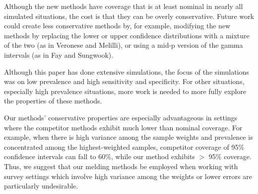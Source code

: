 Although the new methods have coverage that is at least nominal in nearly all simulated situations, the cost is that they can be overly conservative.
Future work could create less conservative methods by, for example, modifying the new methods by replacing the lower or upper confidence distributions with a mixture of the two (as in Veronese and Melilli\cite{veronese2015}), or using a mid-p version of the gamma intervals (as in Fay and Sungwook\cite{FayK:2017}).

Although this paper has done extensive simulations, the focus of the simulations was on low prevalence and high
sensitivity and specificity. For other situations, especially high prevalence situations, more work is needed to more fully explore the properties of these methods.

Our methods' conservative properties are especially advantageous in settings where the competitor methods exhibit much lower than nominal coverage.
For example, when there is high variance among the sample weights and prevalence is concentrated among the highest-weighted samples, competitor coverage of 95\% confidence intervals can fall to 60\%, while our method exhibits \( > \) 95\% coverage.
Thus, we suggest that our melding methods be employed when working with survey settings which involve high variance among the weights or lower errors are particularly undesirable.

